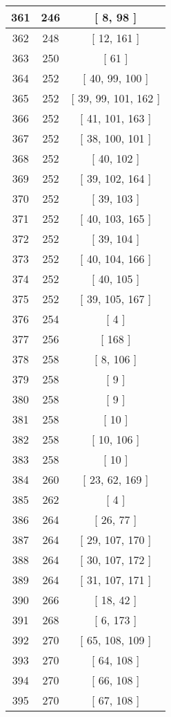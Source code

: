 \begin{center}
\begin{longtable}[H]{|| c c c ||}
\hline
361 & 246 & [ 8, 98 ] \\ 
\hline
362 & 248 & [ 12, 161 ] \\ 
\hline
363 & 250 & [ 61 ] \\ 
\hline
364 & 252 & [ 40, 99, 100 ] \\ 
\hline
365 & 252 & [ 39, 99, 101, 162 ] \\ 
\hline
366 & 252 & [ 41, 101, 163 ] \\ 
\hline
367 & 252 & [ 38, 100, 101 ] \\ 
\hline
368 & 252 & [ 40, 102 ] \\ 
\hline
369 & 252 & [ 39, 102, 164 ] \\ 
\hline
370 & 252 & [ 39, 103 ] \\ 
\hline
371 & 252 & [ 40, 103, 165 ] \\ 
\hline
372 & 252 & [ 39, 104 ] \\ 
\hline
373 & 252 & [ 40, 104, 166 ] \\ 
\hline
374 & 252 & [ 40, 105 ] \\ 
\hline
375 & 252 & [ 39, 105, 167 ] \\ 
\hline
376 & 254 & [ 4 ] \\ 
\hline
377 & 256 & [ 168 ] \\ 
\hline
378 & 258 & [ 8, 106 ] \\ 
\hline
379 & 258 & [ 9 ] \\ 
\hline
380 & 258 & [ 9 ] \\ 
\hline
381 & 258 & [ 10 ] \\ 
\hline
382 & 258 & [ 10, 106 ] \\ 
\hline
383 & 258 & [ 10 ] \\ 
\hline
384 & 260 & [ 23, 62, 169 ] \\ 
\hline
385 & 262 & [ 4 ] \\ 
\hline
386 & 264 & [ 26, 77 ] \\ 
\hline
387 & 264 & [ 29, 107, 170 ] \\ 
\hline
388 & 264 & [ 30, 107, 172 ] \\ 
\hline
389 & 264 & [ 31, 107, 171 ] \\ 
\hline
390 & 266 & [ 18, 42 ] \\ 
\hline
391 & 268 & [ 6, 173 ] \\ 
\hline
392 & 270 & [ 65, 108, 109 ] \\ 
\hline
393 & 270 & [ 64, 108 ] \\ 
\hline
394 & 270 & [ 66, 108 ] \\ 
\hline
395 & 270 & [ 67, 108 ] \\ 

\end{longtable}
\end{center}
